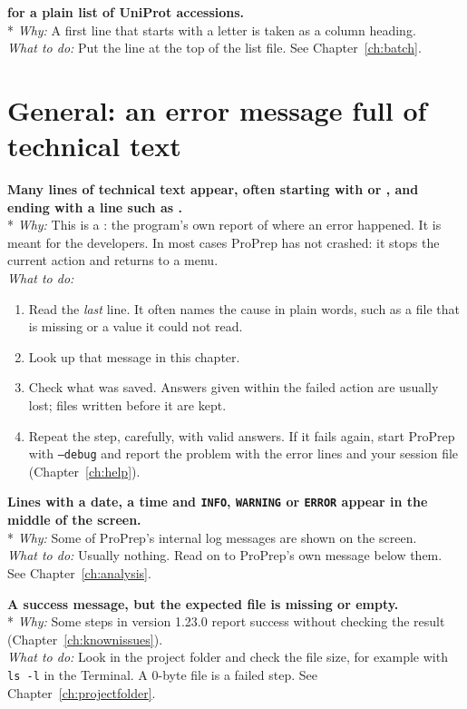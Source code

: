 {\bfseries {} for a
plain list of UniProt accessions.}\\*
\emph{Why:} A first line that starts with a letter is taken as a column
heading.\\
\emph{What to do:} Put the line  at the top of the list
file. See Chapter~\ref{ch:batch}.

\section{General: an error message full of technical text}\label{sec:troubleshooting-general}

{\bfseries Many lines of technical text appear, often starting with
 or ,
and ending with a line such as .}\\*
\emph{Why:} This is a : the program's own report of where an
error happened. It is meant for the developers. In most cases ProPrep has not
crashed: it stops the current action and returns to a menu.\\
\emph{What to do:}
\begin{enumerate}
  \item Read the \emph{last} line. It often names the cause in plain words,
  such as a file that is missing or a value it could not read.
  \item Look up that message in this chapter.
  \item Check what was saved. Answers given within the failed action are
  usually lost; files written before it are kept.
  \item Repeat the step, carefully, with valid answers. If it fails again,
  start ProPrep with \texttt{--debug} and report the problem with the
  error lines and your session file (Chapter~\ref{ch:help}).
\end{enumerate}

{\bfseries Lines with a date, a time and \texttt{INFO}, \texttt{WARNING} or
\texttt{ERROR} appear in the middle of the screen.}\\*
\emph{Why:} Some of ProPrep's internal log messages are shown on the screen.\\
\emph{What to do:} Usually nothing. Read on to ProPrep's own message below
them. See Chapter~\ref{ch:analysis}.

{\bfseries A success message, but the expected file is missing or
empty.}\\*
\emph{Why:} Some steps in version 1.23.0 report success without checking the
result (Chapter~\ref{ch:knownissues}).\\
\emph{What to do:} Look in the project folder and check the file size, for
example with \texttt{ls -l} in the Terminal. A 0-byte file is a failed step.
See Chapter~\ref{ch:projectfolder}.

